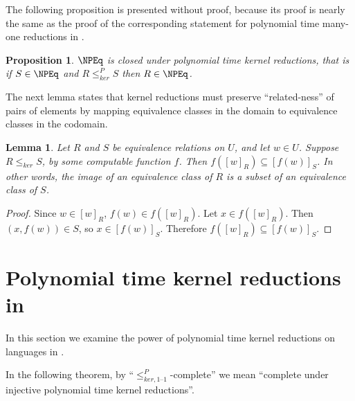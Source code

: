 \documentclass[draft]{article}
\newtheorem{lemma}[lemma]{Lemma}
\newtheorem{proposition}[proposition]{Proposition}
\theoremstyle{definition} \newtheorem{openproblem}[openproblem]{Open problem}
\theoremstyle{definition} \newtheorem{definition}[definition]{Definition}
\newcommand{\kr}{\leq^{P}_{ker}} %
\newcommand{\krnt}{\leq_{ker}} %
\newcommand{\kri}{\leq^{P}_{ker,1\text{--}1}} %
\begin{document}
The following proposition is presented without proof, because its proof is nearly the same as the proof of the corresponding statement for polynomial time many-one reductions in \NP.

\begin{proposition}\label{prop:closed_under_kr}
  $\NPEq$ is closed under polynomial time kernel reductions, that is if $S\in\NPEq$ and $R\kr S$ then $R\in\NPEq$.
\end{proposition}

The next lemma states that kernel reductions must preserve ``related-ness'' of pairs of elements by mapping equivalence classes in the domain to equivalence classes in the codomain.

\begin{lemma}\label{lem:image}
  Let $R$ and $S$ be equivalence relations on $U$, and let $w\in U$.
  Suppose $R\krnt S$, by some computable function $f$.
  Then $f([w]_R)\subseteq [f(w)]_S$.
  In other words, the image of an equivalence class of $R$ is a subset of an equivalence class of $S$.
\end{lemma}
\begin{proof}
  Since $w\in [w]_R$, $f(w)\in f([w]_R)$.
  Let $x\in f([w]_R)$.
  Then $(x, f(w))\in S$, so $x\in [f(w)]_S$.
  Therefore $f([w]_R)\subseteq [f(w)]_S$.
\end{proof}

\section{Polynomial time kernel reductions in \texorpdfstring{\NPEq}{NPEq}}

In this section we examine the power of polynomial time kernel reductions on languages in \NPEq.

In the following theorem, by ``$\kri$-complete'' we mean ``complete under injective polynomial time kernel reductions''.
\end{document}
